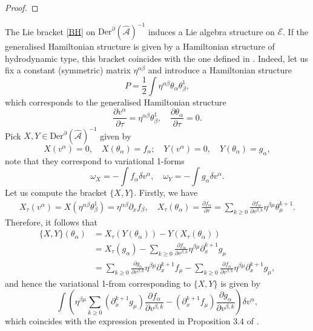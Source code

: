 \documentclass[11pt,a4paper]{amsart}
\numberwithin{equation}{section}
\newcommand{\derx}{\mathrm{Der}^{\qp}(\hm A)}
\newcommand{\diff}[2]{\frac{\partial #1}{\partial #2}}
\newcommand{\qa}{\alpha}
\newcommand{\qb}{\beta}
\newcommand{\qd}{\delta}
\newcommand{\qt}{\tau}
\newcommand{\qth}{\theta}
\newcommand{\qp}{\partial}
\newcommand{\qo}{\omega}
\newcommand{\hm}[1]{\hat{\mathcal #1}}
\newcommand{\kk}[1]{\left(#1\right)}
\numberwithin{equation}{section}
\begin{document}
\begin{proof}
\end{proof}

The Lie bracket \eqref{BH} on $\derx^{-1}$ induces a Lie algebra structure on $\mathcal E$. If the generalised Hamiltonian structure is given by a Hamiltonian structure of hydrodynamic type, this bracket coincides with the one defined in \cite{AL12}. Indeed, let us fix a constant (symmetric) matrix $\eta^{\qa\qb}$ and introduce a Hamiltonian structure 
\[
P = \frac12\int\eta^{\qa\qb}\qth_\qa\qth_\qb^1,
\] 
which corresponds to the
generalised Hamiltonian structure
\[
\diff{v^\qa}{\qt} = \eta^{\qa\qb}\qth_\qb^1,\quad \diff{\qth_\qa}{\qt} = 0.
\]
Pick $X,Y\in\derx^{-1}$ given by 
\[
X(v^\qa) = 0,\quad X(\qth_\qa) = f_\qa;\quad Y(v^\qa) = 0, \quad Y(\qth_\qa) = g_\qa,
\]
note that they correspond to variational 1-forms 
\[
\qo_X = -\int f_\qa\qd v^\qa,\quad \qo_Y = -\int g_\qa\qd v^\qa. 
\]
Let us compute the bracket $\{X,Y\}$. Firstly, we have 
\begin{align*}
    X_\qt(v^\qa) = X\kk{\eta^{\qa\qb}\qth_\qb^1} = \eta^{\qa\qb}\qp_x f_\qb,\quad X_\qt(\qth_\qa) = \diff{f_\qa}{\qt} = \sum_{k\geq 0}\diff{f_\qa}{v^{\qb,k}}\eta^{\qb\mu}\qth_\mu^{k+1}.
\end{align*}
Therefore, it follows that 
\begin{align*}
    \{X,Y\}(\qth_\qa) &= X_\qt\kk{Y(\qth_\qa)}-Y\kk{X_\qt\kk{\qth_\qa}}\\
    &=X_\qt\kk{g_\qa}-\sum_{k\geq 0}\diff{f_\qa}{v^{\qb,k}}\eta^{\qb\mu}\qp_x^{k+1}g_\mu\\
    &=\sum_{k\geq 0}\diff{g_\qa}{v^{\qb,k}}\eta^{\qb\mu}\qp_x^{k+1} f_\mu-\sum_{k\geq 0}\diff{f_\qa}{v^{\qb,k}}\eta^{\qb\mu}\qp_x^{k+1}g_\mu,
\end{align*}
and hence the variational 1-from corresponding to $\{X,Y\}$ is given by  
\[
\int \kk{\eta^{\qb\mu}\sum_{k\geq 0}\kk{\qp_x^{k+1}g_\mu}\diff{f_\qa}{v^{\qb,k}}-\kk{\qp_x^{k+1}f_\mu}\diff{g_\qa}{v^{\qb,k}}}\qd v^\qa,
\]
which coincides with the expression presented in Proposition 3.4 of \cite{AL12}.
\end{document}
